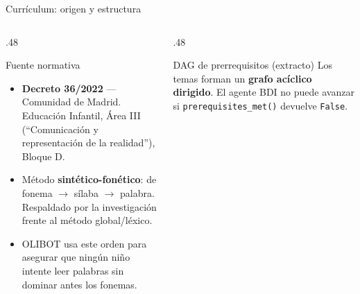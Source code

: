\documentclass[aspectratio=169, 10pt]{beamer}
\begin{document}
\begin{frame}{Currículum: origen y estructura}
  \begin{columns}[T]
    \begin{column}{.48\textwidth}
      \begin{block}{Fuente normativa}
        \small
        \begin{itemize}
          \item \textbf{Decreto 36/2022} — Comunidad de Madrid.\\Educación Infantil, Área III (``Comunicación y representación de la realidad''), Bloque D.
          \item Método \textbf{sintético-fonético}: de fonema $\rightarrow$ sílaba $\rightarrow$ palabra. Respaldado por la investigación frente al método global/léxico.
          \item OLIBOT usa este orden para asegurar que ningún niño intente leer palabras sin dominar antes los fonemas.
        \end{itemize}
      \end{block}
    \end{column}
    \begin{column}{.48\textwidth}
      \begin{block}{DAG de prerrequisitos (extracto)}
        \footnotesize
        Los temas forman un \textbf{grafo acíclico dirigido}.
        El agente BDI no puede avanzar si \texttt{prerequisites\_met()} devuelve \texttt{False}.
        \begin{center}
        \end{center}
      \end{block}
    \end{column}
  \end{columns}
\end{frame}
\end{document}
